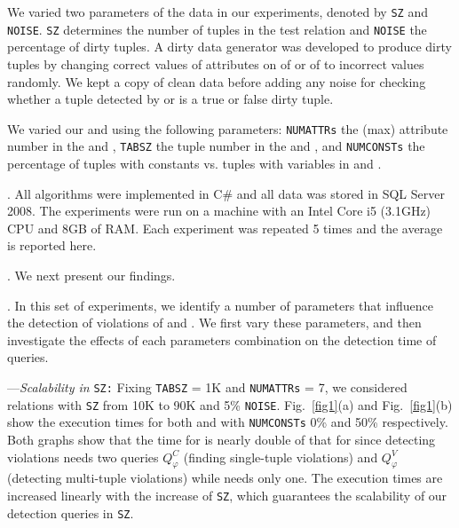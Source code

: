 We varied two parameters of the data in our experiments, denoted by \texttt{SZ} and \texttt{NOISE}. \texttt{SZ} determines the number of tuples in the test relation and \texttt{NOISE} the percentage of dirty tuples. A dirty data generator was developed to produce dirty tuples by changing correct values of attributes on \RHS of \pCFDs or \LHS of \pCINDs to incorrect values randomly. We kept a copy of clean data before adding any noise for checking whether a tuple detected by \pCFDs or \pCINDs is a true or false dirty tuple.

We varied our \pCFDs and \pCINDs using the following parameters: \texttt{NUMATTRs} the (max) attribute number in the \pCFDs and \pCINDs, \texttt{TABSZ} the tuple number in the \pCFDs and \pCINDs, and \texttt{NUMCONSTs} the percentage of tuples with constants vs. tuples with variables in \pCFDs and \pCINDs.

. All algorithms were implemented in C\# and all data was stored in SQL Server 2008. The experiments were run on a machine with an Intel Core i5 (3.1GHz) CPU and 8GB of RAM. Each experiment was repeated 5 times and the average is reported here.

\begin{figure*}
  \centering
  \caption{Experimental results of detecting \pCFD and \pCIND violations}\label{fig1}
\end{figure*}

. We next present our findings.

. In this set of experiments, we identify a number of parameters that influence the detection of violations of \pCFDs and \pCINDs. We first vary these parameters, and then investigate the effects of each parameters combination on the detection time of queries.

\noindent---\textit{Scalability in} \texttt{SZ:} Fixing \texttt{TABSZ} = 1K and \texttt{NUMATTRs} = 7, we considered relations with \texttt{SZ} from 10K to 90K and 5\% \texttt{NOISE}. Fig.~\ref{fig1}(a) and Fig.~\ref{fig1}(b) show the execution times for both \pCFDs and \pCINDs with \texttt{NUMCONSTs} 0\% and 50\% respectively. Both graphs show that the time for \pCFDs is nearly double of that for \pCINDs since detecting \pCFD violations needs two queries $Q_\varphi^C$ (finding single-tuple violations) and $Q_\varphi^V$ (detecting multi-tuple violations) while \pCIND needs only one. The execution times are increased linearly with the increase of \texttt{SZ}, which guarantees the scalability of our detection queries in \texttt{SZ}.

